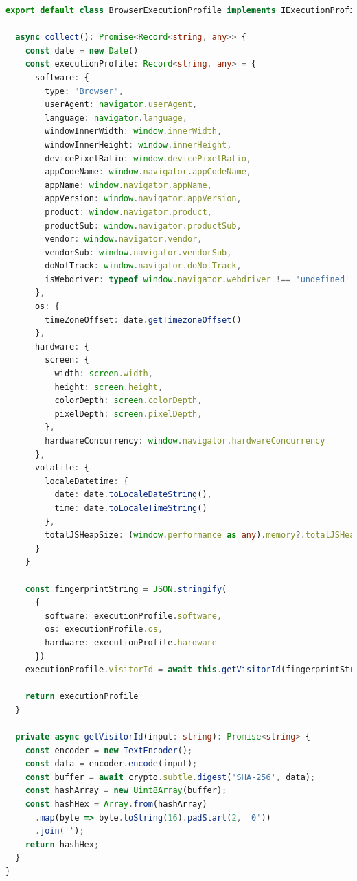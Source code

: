\documentclass[12pt]{tcc}
\begin{document}
\begin{lstlisting}[label={lst:browser_execution_profile_abstract_class}, caption={Implementação da classe responsável por representar um perfil de execução.}, language=TypeScript, breaklines=true]
export default class BrowserExecutionProfile implements IExecutionProfile {

  async collect(): Promise<Record<string, any>> {
    const date = new Date()
    const executionProfile: Record<string, any> = {
      software: {
        type: "Browser",
        userAgent: navigator.userAgent,
        language: navigator.language,
        windowInnerWidth: window.innerWidth,
        windowInnerHeight: window.innerHeight,
        devicePixelRatio: window.devicePixelRatio,
        appCodeName: window.navigator.appCodeName,
        appName: window.navigator.appName,
        appVersion: window.navigator.appVersion,
        product: window.navigator.product,
        productSub: window.navigator.productSub,
        vendor: window.navigator.vendor,
        vendorSub: window.navigator.vendorSub,
        doNotTrack: window.navigator.doNotTrack,
        isWebdriver: typeof window.navigator.webdriver !== 'undefined' ? window.navigator.webdriver.toString() : 'unknown'
      },
      os: {
        timeZoneOffset: date.getTimezoneOffset()
      },
      hardware: {
        screen: {
          width: screen.width,
          height: screen.height,
          colorDepth: screen.colorDepth,
          pixelDepth: screen.pixelDepth,
        },
        hardwareConcurrency: window.navigator.hardwareConcurrency
      },
      volatile: {
        localeDatetime: {
          date: date.toLocaleDateString(),
          time: date.toLocaleTimeString()
        },
        totalJSHeapSize: (window.performance as any).memory?.totalJSHeapSize || -1
      }
    }

    const fingerprintString = JSON.stringify(
      {
        software: executionProfile.software,
        os: executionProfile.os,
        hardware: executionProfile.hardware
      })
    executionProfile.visitorId = await this.getVisitorId(fingerprintString)

    return executionProfile
  }

  private async getVisitorId(input: string): Promise<string> {
    const encoder = new TextEncoder();
    const data = encoder.encode(input);
    const buffer = await crypto.subtle.digest('SHA-256', data);
    const hashArray = new Uint8Array(buffer);
    const hashHex = Array.from(hashArray)
      .map(byte => byte.toString(16).padStart(2, '0'))
      .join('');
    return hashHex;
  }
}
\end{lstlisting}
\end{document}
